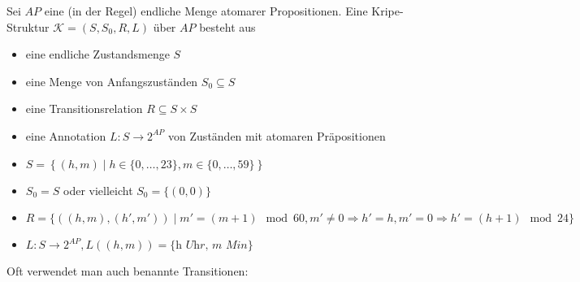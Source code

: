 \begin{defn}
	Sei $AP$ eine (in der Regel) endliche Menge atomarer Propositionen. Eine Kripe-Struktur $\mathcal{K} = (S, S_0, R, L)$ über $AP$ besteht aus
	\begin{itemize}
		\item eine endliche Zustandsmenge $S$
		\item eine Menge von Anfangszuständen $S_0 \subseteq S$
		\item eine Transitionsrelation $R \subseteq S \times S$
		\item eine Annotation $L:S \rightarrow 2^{AP}$ von Zuständen mit atomaren Präpositionen
	\end{itemize}
\end{defn}

\begin{bsp}[Digitaluhr]
	\mbox{}
	\begin{center}
	\end{center}

	\begin{itemize}
		\item $S = \left \{(h,m) \mid h \in \{0, \dots, 23\}, m \in \{0, \dots, 59\} \right \}$
		\item $S_0 = S $ oder vielleicht $S_0 = \{(0,0)\}$
		\item $R = \{\left((h,m),(h',m')\right) \mid m' = (m+1) \mod 60, m' \neq 0 \Rightarrow h'=h, m' = 0 \Rightarrow h' = (h+1) \mod 24\}$
		\item $L:S\rightarrow 2^{AP}, L\left((h,m)\right) = \{\textit{h Uhr, m Min}\}$
	\end{itemize}
\end{bsp}

Oft verwendet man auch benannte Transitionen:

